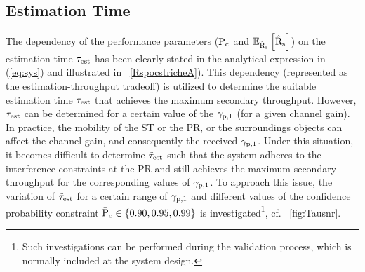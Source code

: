 \subsection{Estimation Time}
\label{esttime}
The dependency of the performance parameters ($\text{P}_{\text{c}}$ and ${\mathbb E}_{\hat{\text{{R}}}_{\text{s}}}\left[ \hat{\text{{R}}}_{\text{s}} \right]$) on the estimation time $\tau_{\text{est}}$ has been clearly stated in the analytical expression in (\ref{eq:sys}) and illustrated in \figurename~\ref{RspocstricheA}). This dependency (represented as the estimation-throughput tradeoff) is utilized to determine the suitable estimation time $\tilde{\tau}_{\text{est}}$ that achieves the maximum secondary throughput. However, $\tilde{\tau}_{\text{est}}$ can be determined for a certain value of the ${\gamma}_{\text{p,1}}$ (for a given channel gain). In practice, the mobility of the ST or the PR, or the surroundings objects can affect the channel gain, and consequently the received ${\gamma}_{\text{p,1}}$. Under this situation, it becomes difficult to determine $\tilde{\tau}_{\text{est}}$ such that the system adheres to the interference constraints at the PR and still achieves the maximum secondary throughput for the corresponding values of ${\gamma}_{\text{p,1}}$. To approach this issue, the variation of $\tilde{\tau}_{\text{est}}$ for a certain range of ${\gamma}_{\text{p,1}}$ and different values of the confidence probability constraint $\bar{\text{P}}_{\text{c}} \in \{0.90, 0.95, 0.99\}$ is investigated\footnote{Such investigations can be performed during the validation process, which is normally included at the system design.}, cf. \figurename~\ref{fig:Tausnr}. %

